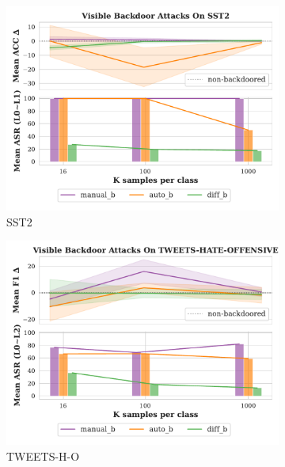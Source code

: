 \begin{figure}[!ht]
\begin{subfigure}{.5\textwidth}
  \centering
  \includegraphics[width=\linewidth]{figures/evaluation_media/SST2_score_n_attack.pdf}
  \caption{SST2}
  \label{fig:sst}
\end{subfigure}%
\begin{subfigure}{.5\textwidth}
  \centering
  \includegraphics[width=\linewidth]{figures/evaluation_media/TWEETS-HATE-OFFENSIVE_score_n_attack.pdf}
  \caption{TWEETS-H-O}
  \label{fig:tweets}
\end{subfigure}
\begin{subfigure}{.5\textwidth}
  \centering

\end{subfigure}
\end{figure}
